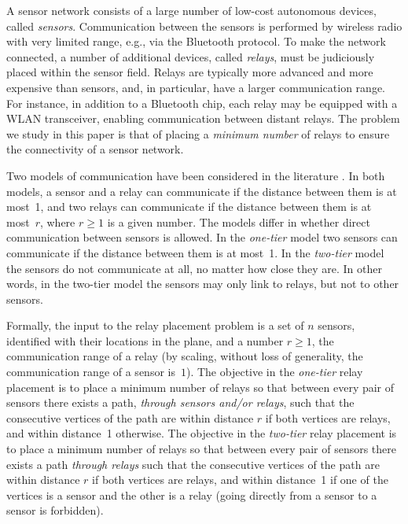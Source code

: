 \documentclass[11pt,a4paper]{article}
\theoremstyle{definition}
\theoremstyle{remark}
\begin{document}
A sensor network consists of a large number of low-cost autonomous devices, called \emph{sensors}. Communication between the sensors is performed by wireless radio with very limited range, e.g., via the Bluetooth protocol. To make the network connected, a number of additional devices, called \emph{relays}, must be judiciously placed within the sensor field.  Relays are typically more advanced and more expensive than sensors, and, in particular, have a larger communication range.  For instance, in addition to a Bluetooth chip, each relay may be equipped with a WLAN transceiver, enabling communication between distant relays.  The problem we study in this paper is that of placing a \emph{minimum number} of relays to ensure the connectivity of a sensor network.

Two models of communication have been considered in the literature \cite{bredin10deploying,chen00approximations,chen01approximations,cheng08relay,liu06optimal,lloyd07relay,srinivas06mobile,zhang07fault-tolerant}.  In both models, a sensor and a relay can communicate if the distance between them is at most~1, and two relays can communicate if the distance between them is at most~$r$, where $r\ge1$ is a given number.  The models differ in whether direct communication between sensors is allowed.  In the \emph{one-tier} model two sensors can communicate if the distance between them is at most~1.  In the \emph{two-tier} model the sensors do not communicate at all, no matter how close they are.  In other words, in the two-tier model the sensors may only link to relays, but not to other sensors.

Formally, the input to the relay placement problem is a set of $n$ sensors, identified with their locations in the plane, and a number $r\ge1$, the communication range of a relay (by scaling, without loss of generality, the communication range of a sensor is~$1$).  The objective in the \emph{one-tier} relay placement is to place a minimum number of relays so that between every pair of sensors there exists a path, \emph{through sensors and/or relays}, such that the consecutive vertices of the path are within distance $r$ if both vertices are relays, and within distance~1 otherwise.  The objective in the \emph{two-tier} relay placement is to place a minimum number of relays so that between every pair of sensors there exists a path \emph{through relays} such that the consecutive vertices of the path are within distance $r$ if both vertices are relays, and within distance~1 if one of the vertices is a sensor and the other is a relay (going directly from a sensor to a sensor is forbidden).
\end{document}

